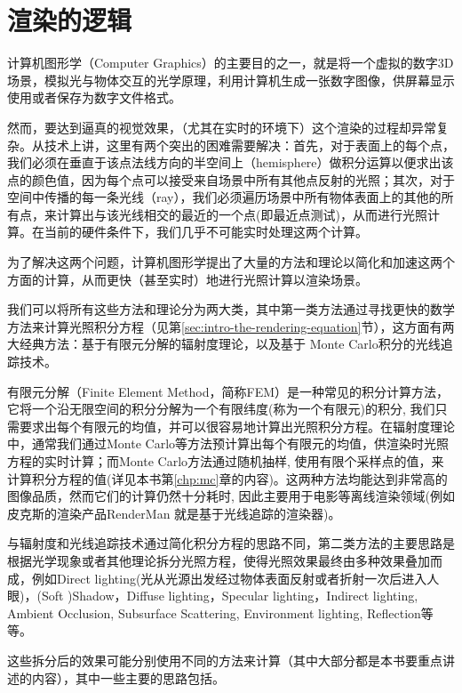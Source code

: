 \section{渲染的逻辑}
计算机图形学（Computer Graphics）的主要目的之一，就是将一个虚拟的数字3D场景，模拟光与物体交互的光学原理，利用计算机生成一张数字图像，供屏幕显示使用或者保存为数字文件格式。

然而，要达到逼真的视觉效果，（尤其在实时的环境下）这个渲染的过程却异常复杂。从技术上讲，这里有两个突出的困难需要解决：首先，对于表面上的每个点，我们必须在垂直于该点法线方向的半空间上（hemisphere）做积分运算以便求出该点的颜色值，因为每个点可以接受来自场景中所有其他点反射的光照；其次，对于空间中传播的每一条光线（ray），我们必须遍历场景中所有物体表面上的其他的所有点，来计算出与该光线相交的最近的一个点(即最近点测试)，从而进行光照计算。在当前的硬件条件下，我们几乎不可能实时处理这两个计算。

为了解决这两个问题，计算机图形学提出了大量的方法和理论以简化和加速这两个方面的计算，从而更快（甚至实时）地进行光照计算以渲染场景。

我们可以将所有这些方法和理论分为两大类，其中第一类方法通过寻找更快的数学方法来计算光照积分方程（见第\ref{sec:intro-the-rendering-equation}节），这方面有两大经典方法：基于有限元分解的辐射度理论，以及基于 Monte Carlo积分的光线追踪技术。

有限元分解（Finite Element Method，简称FEM）是一种常见的积分计算方法，它将一个沿无限空间的积分分解为一个有限纬度(称为一个有限元)的积分, 我们只需要求出每个有限元的均值，并可以很容易地计算出光照积分方程。在辐射度理论中，通常我们通过Monte Carlo等方法预计算出每个有限元的均值，供渲染时光照方程的实时计算；而Monte Carlo方法通过随机抽样, 使用有限个采样点的值，来计算积分方程的值(详见本书第\ref{chp:mc}章的内容)。这两种方法均能达到非常高的图像品质，然而它们的计算仍然十分耗时, 因此主要用于电影等离线渲染领域(例如皮克斯的渲染产品RenderMan 就是基于光线追踪的渲染器)。

与辐射度和光线追踪技术通过简化积分方程的思路不同，第二类方法的主要思路是根据光学现象或者其他理论拆分光照方程，使得光照效果最终由多种效果叠加而成，例如Direct lighting(光从光源出发经过物体表面反射或者折射一次后进入人眼)，(Soft )Shadow，Diffuse lighting，Specular lighting，Indirect lighting, Ambient Occlusion, Subsurface Scattering, Environment lighting, Reflection等等。

这些拆分后的效果可能分别使用不同的方法来计算（其中大部分都是本书要重点讲述的内容），其中一些主要的思路包括。

